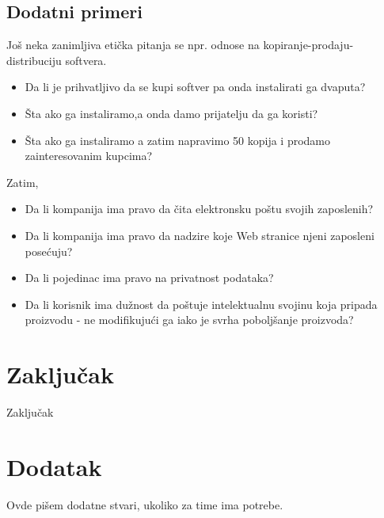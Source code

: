 \documentclass[a4paper]{article}
\begin{document}
\subsection{Dodatni primeri}
Još neka zanimljiva etička pitanja se npr. odnose na kopiranje-prodaju-distribuciju softvera.
\begin{itemize}
\item Da li je prihvatljivo da se kupi softver pa onda instalirati ga dvaputa?
\item Šta ako ga instaliramo,a onda damo prijatelju da ga koristi?
\item Šta ako ga instaliramo a zatim napravimo 50 kopija i prodamo zainteresovanim kupcima?
\end{itemize}
Zatim,
\begin{itemize} 
\item Da li kompanija ima pravo da čita elektronsku poštu svojih zaposlenih?
\item Da li kompanija ima pravo da nadzire koje Web stranice njeni zaposleni posećuju?
\item Da li pojedinac ima pravo na privatnost podataka?
\item Da li korisnik ima dužnost da poštuje intelektualnu svojinu koja pripada proizvodu - ne modifikujući ga iako je svrha poboljšanje proizvoda?
\end{itemize}

\section{Zaključak}
\label{sec:zakljucak}

Zaključak

\appendix
 


\appendix
\section{Dodatak}
Ovde pišem dodatne stvari, ukoliko za time ima potrebe.
\end{document}
